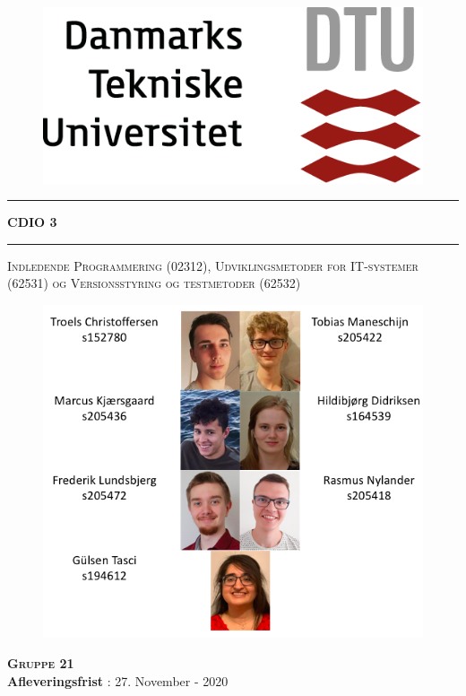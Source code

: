 \begin{titlepage}
\begin{center}
\vspace{2cm}


\begin{figure}[H]
    \centering
    \includegraphics[width=0.4\linewidth]{root/dtu.png}
    \label{fig:DTU}
\end{figure}


\hrule
\vspace{.5cm}
{ \huge \bfseries CDIO 3} %
\vspace{.5cm}

\hrule
\vspace{.5cm}

\textsc{Indledende Programmering (02312), Udviklingsmetoder for IT-systemer (62531) og Versionsstyring og testmetoder (62532)}\\

\begin{figure}[H]
    \centering
    \includegraphics[width=0.8\linewidth]{root/navne.png}
\end{figure}

\vspace{.2cm}
\centering

\textsc{\textbf{Gruppe 21}}\\


\vspace{2cm}
\centering \textbf{Afleveringsfrist} : 27. November - 2020 %
\end{center}
\end{titlepage}

